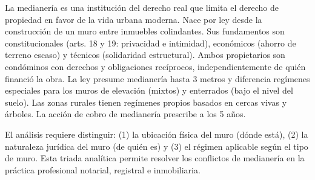 \documentclass[12pt,oneside]{book}
\begin{document}
\begin{important}
La medianería es una institución del derecho real que limita el derecho de propiedad en favor de la vida urbana moderna. Nace por ley desde la construcción de un muro entre inmuebles colindantes. Sus fundamentos son constitucionales (arts. 18 y 19: privacidad e intimidad), económicos (ahorro de terreno escaso) y técnicos (solidaridad estructural). Ambos propietarios son condóminos con derechos y obligaciones recíprocos, independientemente de quién financió la obra. La ley presume medianería hasta 3 metros y diferencia regímenes especiales para los muros de elevación (mixtos) y enterrados (bajo el nivel del suelo). Las zonas rurales tienen regímenes propios basados en cercas vivas y árboles. La acción de cobro de medianería prescribe a los 5 años.
\end{important}

El análisis requiere distinguir: (1) la ubicación física del muro (dónde está), (2) la naturaleza jurídica del muro (de quién es) y (3) el régimen aplicable según el tipo de muro. Esta triada analítica permite resolver los conflictos de medianería en la práctica profesional notarial, registral e inmobiliaria.
\end{document}
